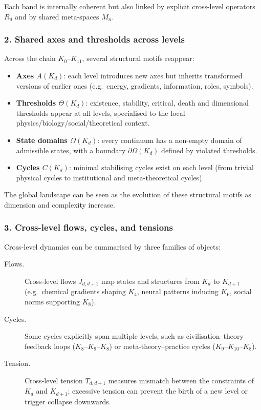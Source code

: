 Each band is internally coherent but also linked by explicit cross-level
operators $R_d$ and by shared meta-spaces $M_n$.

\subsubsection{2. Shared axes and thresholds across levels}

Across the chain $K_0$--$K_{11}$, several structural motifs reappear:
\begin{itemize}
  \item \textbf{Axes $A(K_d)$}: each level introduces new axes but inherits
        transformed versions of earlier ones (e.g.\ energy, gradients,
        information, roles, symbols).
  \item \textbf{Thresholds $\Theta(K_d)$}: existence, stability, critical,
        death and dimensional thresholds appear at all levels, specialised
        to the local physics/biology/social/theoretical context.
  \item \textbf{State domains $\Omega(K_d)$}: every continuum has a
        non-empty domain of admissible states, with a boundary
        $\partial\Omega(K_d)$ defined by violated thresholds.
  \item \textbf{Cycles $C(K_d)$}: minimal stabilising cycles exist on each
        level (from trivial physical cycles to institutional and
        meta-theoretical cycles).
\end{itemize}

The global landscape can be seen as the evolution of these structural
motifs as dimension and complexity increase.

\subsubsection{3. Cross-level flows, cycles, and tensions}

Cross-level dynamics can be summarised by three families of objects:
\begin{description}
  \item[Flows.] Cross-level flows $J_{d,d+1}$ map states and structures
        from $K_d$ to $K_{d+1}$ (e.g.\ chemical gradients shaping $K_4$,
        neural patterns inducing $K_6$, social norms supporting $K_8$).
  \item[Cycles.] Some cycles explicitly span multiple levels, such as
        civilisation--theory feedback loops ($K_8$--$K_9$--$K_8$) or
        meta-theory--practice cycles ($K_9$--$K_{10}$--$K_8$).
  \item[Tension.] Cross-level tension $T_{d,d+1}$ measures mismatch between
        the constraints of $K_d$ and $K_{d+1}$; excessive tension can
        prevent the birth of a new level or trigger collapse downwards.
\end{description}

